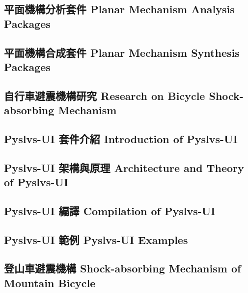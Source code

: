 \documentclass[14pt,a4paper]{report}  %
\newcommand{\sixteen}{\fontsize{16pt}{\baselineskip}\selectfont}%
\begin{document}
{{{\begin{center}
      \section{平面機構分析套件 Planar Mechanism Analysis Packages}
      \section{平面機構合成套件 Planar Mechanism Synthesis Packages}
      \section{自行車避震機構研究 Research on Bicycle Shock-absorbing Mechanism}
     \end{center}}
        \newpage

 {\begin{center}
        \chapter{Pyslvs-UI 套件介紹 Introduction of Pyslvs-UI}
        \end{center}}
        {\begin{flushleft}
        \sixteen {內文內文內文123ABC}
        \end{flushleft}
        {\begin{center}
      \section{Pyslvs-UI 架構與原理 Architecture and Theory of Pyslvs-UI}
      \section{Pyslvs-UI 編譯 Compilation of Pyslvs-UI}
      \section{Pyslvs-UI 範例 Pyslvs-UI Examples}
     \end{center}}
        \newpage

 {\begin{center}
        \chapter{登山車避震機構 Shock-absorbing Mechanism of Mountain Bicycle}
        \end{center}}
        {\begin{flushleft}
        \sixteen {內文內文內文123ABC}
        \end{flushleft}
        {\begin{center}

\end{center}}}}}}
\end{document}
